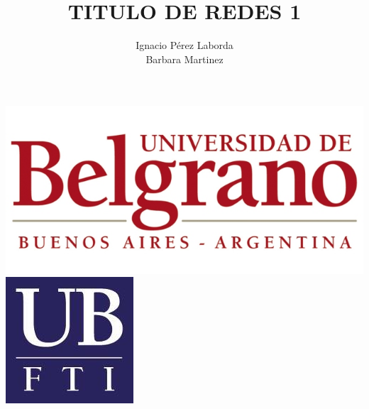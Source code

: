 \documentclass{beamer}
\title[Tecnologia]
{TITULO DE REDES 1}
\subtitle{}
\author[Grupo 1] 
{Ignacio P\'erez Laborda\\Barbara Martinez}
\institute[UB--FTI] 
{
  Facultad de Tecnolog\'ia Inform\'atica\\
  Universidad de Belgrano
}
\date[\today]
\begin{document}
\begin{frame}

\includegraphics[height=0.2\textheight]{ub2.jpg} \hspace*{6cm}
\includegraphics[height=0.19\textheight]{FTI.jpg}  
\\[-0.1cm]
\titlepage

\end{frame}
\end{document}
